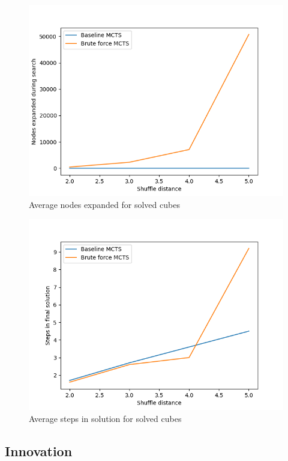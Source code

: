 \documentclass[10pt,twocolumn,letterpaper]{article}
\begin{document}
\begin{figure}
  \includegraphics[width=\linewidth]{brute_nodes.png}
  \caption{Average nodes expanded for solved cubes}
  \label{fig:net}
\end{figure}

\begin{figure}
  \includegraphics[width=\linewidth]{brute_steps.png}
  \caption{Average steps in solution for solved cubes}
  \label{fig:net}
\end{figure}

\subsection{Innovation}
\end{document}
